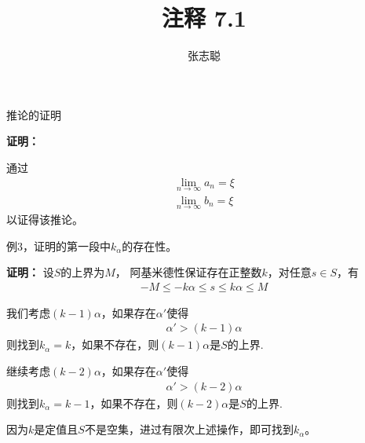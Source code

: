 \documentclass{article}
\begin{document}
\title{注释 7.1}
\author{张志聪}
\maketitle

\begin{zremark}
  推论的证明
\end{zremark}

\textbf{证明：}

通过
\begin{align*}
  \lim\limits_{n \to \infty} a_n = \xi \\
  \lim\limits_{n \to \infty} b_n = \xi
\end{align*}
以证得该推论。

\begin{zremark}
  例3，证明的第一段中$k_\alpha$的存在性。
\end{zremark}
\textbf{证明：}
设$S$的上界为$M$，
阿基米德性保证存在正整数$k$，对任意$s \in S$，有
\begin{align*}
 -M \leq -k \alpha \leq s \leq k \alpha \leq M
\end{align*}

我们考虑$(k - 1) \alpha$，如果存在$\alpha'$使得
\begin{align*}
  \alpha' > (k - 1) \alpha
\end{align*}
则找到$k_\alpha = k$，如果不存在，则$(k - 1)\alpha$是$S$的上界.

继续考虑$(k - 2) \alpha$，如果存在$\alpha'$使得
\begin{align*}
  \alpha' > (k - 2) \alpha
\end{align*}
则找到$k_\alpha = k - 1$，如果不存在，则$(k - 2)\alpha$是$S$的上界.

因为$k$是定值且$S$不是空集，进过有限次上述操作，即可找到$k_\alpha$。
\end{document}
